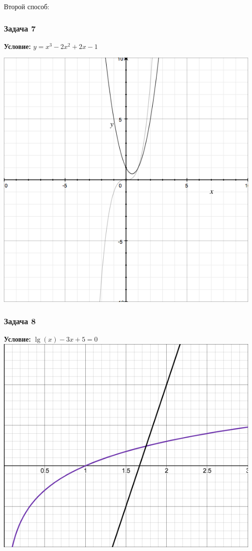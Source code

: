 \documentclass[]{article}
\begin{document}
Второй способ: 

\subsubsection{Задача 7}

\textbf{Условие: }$y=x^3-2x^2+2x-1$
\newline

\begingroup
\centering
\includegraphics[scale=0.3]{graph6}
\endgroup

\subsubsection{Задача 8}

\textbf{Условие: } $\lg(x)-3x+5=0$
\newline
\begingroup
\centering
\includegraphics[scale=0.3]{graph7}
\endgroup
\end{document}
